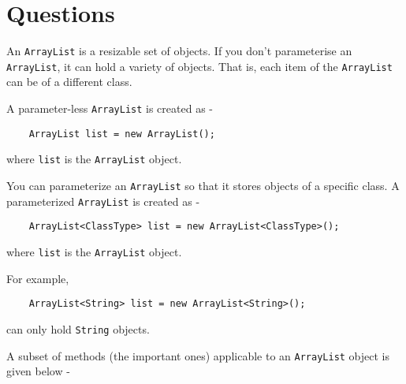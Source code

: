 
\section*{Questions}
\begin{questions}

\question
An \texttt{ArrayList} is a resizable set of objects. If you don't parameterise an \texttt{ArrayList}, it can hold a variety of objects. That is, each item of the \texttt{ArrayList} can be of a different class.

A parameter-less \texttt{ArrayList} is created as -

\begin{lstlisting}
    ArrayList list = new ArrayList();
\end{lstlisting}
where \texttt{list} is the \texttt{ArrayList} object.

You can parameterize an \texttt{ArrayList} so that it stores objects of a specific class. A parameterized \texttt{ArrayList} is created as -

\begin{lstlisting}
    ArrayList<ClassType> list = new ArrayList<ClassType>();
\end{lstlisting}

where \texttt{list} is the \texttt{ArrayList} object.

\newpage

For example,

\begin{lstlisting}
    ArrayList<String> list = new ArrayList<String>();
\end{lstlisting}

can only hold \texttt{String} objects.

A subset of methods (the important ones) applicable to an \texttt{ArrayList} object is given below -


\end{questions}
